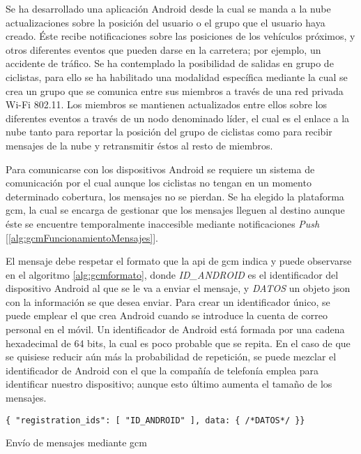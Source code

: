 Se ha desarrollado una aplicación Android desde la cual se manda a la nube
actualizaciones sobre la posición del usuario o el grupo que el usuario haya
creado. Éste recibe notificaciones sobre las posiciones de los vehículos
próximos, y otros diferentes eventos que pueden darse en la carretera; por
ejemplo, un accidente de tráfico. Se ha contemplado la posibilidad de salidas
en grupo de ciclistas, para ello se ha habilitado una modalidad específica
mediante la cual se crea un grupo que se comunica entre sus miembros a través
de una red privada Wi-Fi 802.11. Los miembros se mantienen actualizados
entre ellos sobre los diferentes eventos a través de un nodo denominado líder,
el cual es el enlace a la nube tanto para reportar la posición del grupo de
ciclistas como para recibir mensajes de la nube y retransmitir éstos al resto
de miembros.

Para comunicarse con los dispositivos Android se requiere un sistema de
comunicación por el cual aunque los ciclistas no tengan en un momento
determinado cobertura, los mensajes no se pierdan. Se ha elegido la plataforma
\gls{gcm}, la cual se encarga de gestionar que los mensajes lleguen al destino
aunque éste se encuentre temporalmente inaccesible mediante notificaciones
\emph{Push} [\ref{alg:gcmFuncionamientoMensajes}].

El mensaje debe respetar el formato que la \gls{api} de \gls{gcm} indica y
puede observarse en el algoritmo \ref{alg:gcmformato}, donde \emph{ID\_ANDROID}
es el identificador del dispositivo Android al que se le va a enviar el
mensaje, y \emph{DATOS} un objeto \gls{json} con la información se que desea
enviar. Para crear un identificador único, se puede emplear el que crea Android
cuando se introduce la cuenta de correo personal en el móvil. Un identificador
de Android está formada por una cadena hexadecimal de 64 bits, la cual es poco
probable que se repita. En el caso de que se quisiese reducir aún más la
probabilidad de repetición, se puede mezclar el identificador de Android con
el que la compañía de telefonía emplea para identificar nuestro dispositivo;
aunque esto último aumenta el tamaño de los mensajes.

\begin{listing}
	\begin{minipage}{.4\textwidth}
		\begin{verbatim}
{ "registration_ids": [ "ID_ANDROID" ], data: { /*DATOS*/ }}
		\end{verbatim}
	\end{minipage}
	\caption{Envío de mensajes mediante \gls{gcm}}\label{alg:gcmformato}
\end{listing}

